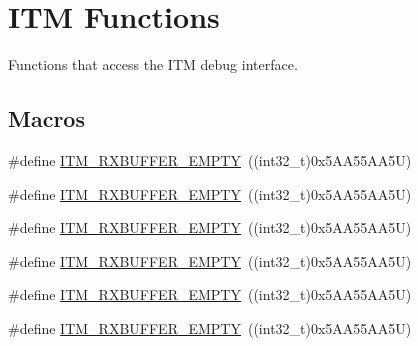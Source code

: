 \hypertarget{group___c_m_s_i_s__core___debug_functions}{}\section{I\+TM Functions}
\label{group___c_m_s_i_s__core___debug_functions}


Functions that access the I\+TM debug interface.  


\subsection*{Macros}
\begin{DoxyCompactItemize}
\item 
\#define \mbox{\hyperlink{group___c_m_s_i_s__core___debug_functions_gaa822cb398ee022b59e9e6c5d7bbb228a}{I\+T\+M\+\_\+\+R\+X\+B\+U\+F\+F\+E\+R\+\_\+\+E\+M\+P\+TY}}~((int32\+\_\+t)0x5\+A\+A55\+A\+A5\+U)
\item 
\#define \mbox{\hyperlink{group___c_m_s_i_s__core___debug_functions_gaa822cb398ee022b59e9e6c5d7bbb228a}{I\+T\+M\+\_\+\+R\+X\+B\+U\+F\+F\+E\+R\+\_\+\+E\+M\+P\+TY}}~((int32\+\_\+t)0x5\+A\+A55\+A\+A5\+U)
\item 
\#define \mbox{\hyperlink{group___c_m_s_i_s__core___debug_functions_gaa822cb398ee022b59e9e6c5d7bbb228a}{I\+T\+M\+\_\+\+R\+X\+B\+U\+F\+F\+E\+R\+\_\+\+E\+M\+P\+TY}}~((int32\+\_\+t)0x5\+A\+A55\+A\+A5\+U)
\item 
\#define \mbox{\hyperlink{group___c_m_s_i_s__core___debug_functions_gaa822cb398ee022b59e9e6c5d7bbb228a}{I\+T\+M\+\_\+\+R\+X\+B\+U\+F\+F\+E\+R\+\_\+\+E\+M\+P\+TY}}~((int32\+\_\+t)0x5\+A\+A55\+A\+A5\+U)
\item 
\#define \mbox{\hyperlink{group___c_m_s_i_s__core___debug_functions_gaa822cb398ee022b59e9e6c5d7bbb228a}{I\+T\+M\+\_\+\+R\+X\+B\+U\+F\+F\+E\+R\+\_\+\+E\+M\+P\+TY}}~((int32\+\_\+t)0x5\+A\+A55\+A\+A5\+U)
\item 
\#define \mbox{\hyperlink{group___c_m_s_i_s__core___debug_functions_gaa822cb398ee022b59e9e6c5d7bbb228a}{I\+T\+M\+\_\+\+R\+X\+B\+U\+F\+F\+E\+R\+\_\+\+E\+M\+P\+TY}}~((int32\+\_\+t)0x5\+A\+A55\+A\+A5\+U)
\end{DoxyCompactItemize}
